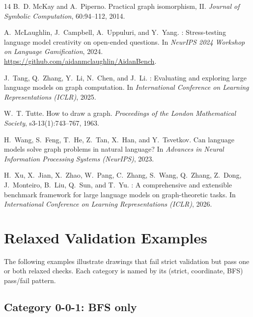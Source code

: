 \documentclass{article}
\begin{document}
\begin{thebibliography}{14}
B.~D. McKay and A.~Piperno.
\newblock Practical graph isomorphism, {II}.
\newblock \emph{Journal of Symbolic Computation}, 60:94--112, 2014.

A.~McLaughlin, J.~Campbell, A.~Uppuluri, and Y.~Yang.
: Stress-testing language model creativity on open-ended questions.
\newblock In \emph{NeurIPS 2024 Workshop on Language Gamification}, 2024.
\newblock \url{https://github.com/aidanmclaughlin/AidanBench}.

J.~Tang, Q.~Zhang, Y.~Li, N.~Chen, and J.~Li.
: Evaluating and exploring large language models on graph computation.
\newblock In \emph{International Conference on Learning Representations (ICLR)}, 2025.

W.~T. Tutte.
\newblock How to draw a graph.
\newblock \emph{Proceedings of the London Mathematical Society}, s3-13(1):743--767, 1963.

H.~Wang, S.~Feng, T.~He, Z.~Tan, X.~Han, and Y.~Tsvetkov.
\newblock Can language models solve graph problems in natural language?
\newblock In \emph{Advances in Neural Information Processing Systems (NeurIPS)}, 2023.

H.~Xu, X.~Jian, X.~Zhao, W.~Pang, C.~Zhang, S.~Wang, Q.~Zhang, Z.~Dong, J.~Monteiro, B.~Liu, Q.~Sun, and T.~Yu.
: A comprehensive and extensible benchmark framework for large language models on graph-theoretic tasks.
\newblock In \emph{International Conference on Learning Representations (ICLR)}, 2026.

\end{thebibliography}

\newpage
\appendix
\section{Relaxed Validation Examples}
\label{app:examples}

The following examples illustrate drawings that fail strict validation but pass one or both relaxed checks. Each category is named by its (strict, coordinate, BFS) pass/fail pattern.

\subsection*{Category 0-0-1: BFS only}
\end{document}

